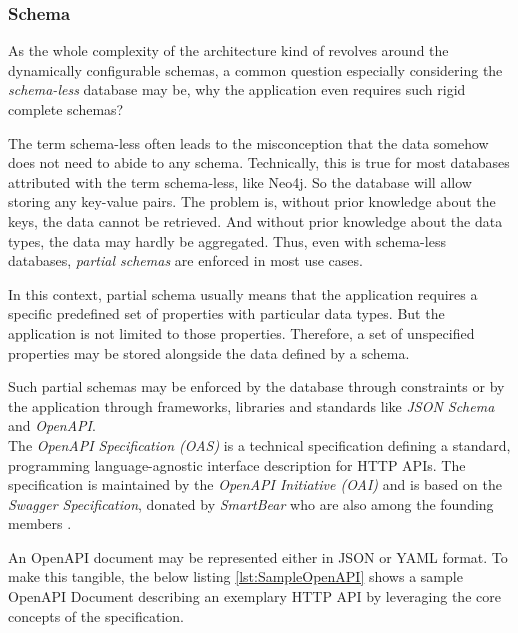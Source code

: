 \subsubsection{Schema}
As the whole complexity of the architecture kind of revolves around the dynamically configurable schemas, a common question especially considering the \emph{schema-less} database may be, why the application even requires such rigid complete schemas?\par
The term schema-less often leads to the misconception that the data somehow does not need to abide to any schema. Technically, this is true for most databases attributed with the term schema-less, like Neo4j. So the database will allow storing any key-value pairs. The problem is, without prior knowledge about the keys, the data cannot be retrieved. And without prior knowledge about the data types, the data may hardly be aggregated. Thus, even with schema-less databases, \emph{partial schemas} are enforced in most use cases.\par
In this context, partial schema usually means that the application requires a specific predefined set of properties with particular data types. But the application is not limited to those properties. Therefore, a set of unspecified properties may be stored alongside the data defined by a schema.\par 
Such partial schemas may be enforced by the database through constraints or by the application through frameworks, libraries and standards like \emph{JSON Schema} \cite{JsonSchema} and \emph{OpenAPI}.\\

The \emph{OpenAPI Specification (OAS)} is a technical specification defining a standard, programming language-agnostic interface description for HTTP APIs. The specification is maintained by the \emph{OpenAPI Initiative (OAI)} and is based on the \emph{Swagger Specification}, donated by \emph{SmartBear} who are also among the founding members \cite{OpenAPISpec}.\par
An OpenAPI document may be represented either in JSON or YAML format. To make this tangible, the below listing \ref{lst:SampleOpenAPI} shows a sample OpenAPI Document describing an exemplary HTTP API by leveraging the core concepts of the specification.


